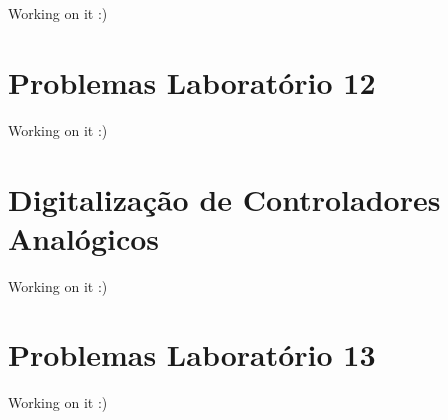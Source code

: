 \documentclass[
]{book}
\theoremstyle{definition}
\theoremstyle{definition}
\theoremstyle{definition}
\theoremstyle{remark}
\begin{document}
Working on it :)

\hypertarget{problemas-laboratuxf3rio-12}{%
\chapter*{Problemas Laboratório 12}\label{problemas-laboratuxf3rio-12}}

Working on it :)

\hypertarget{digitalizauxe7uxe3o-de-controladores-analuxf3gicos}{%
\chapter{Digitalização de Controladores Analógicos}\label{digitalizauxe7uxe3o-de-controladores-analuxf3gicos}}

Working on it :)

\hypertarget{problemas-laboratuxf3rio-13}{%
\chapter*{Problemas Laboratório 13}\label{problemas-laboratuxf3rio-13}}

Working on it :)

  
\end{document}
